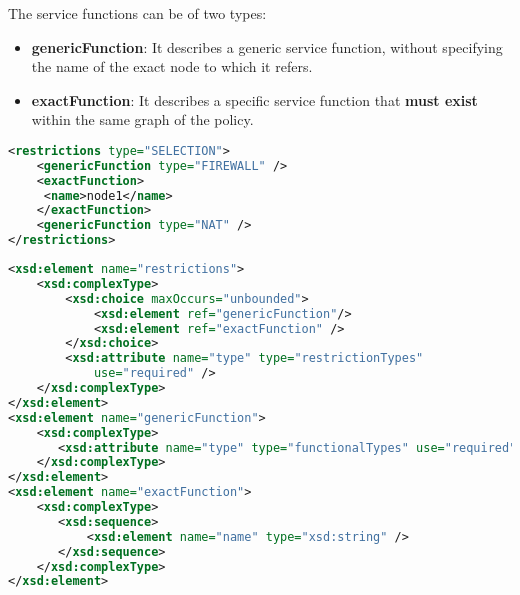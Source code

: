 The service functions can be of two types:
\begin{itemize}
 \item \textbf{genericFunction}: It describes a generic service function, without specifying the name of the exact node to which it refers.
 \item \textbf{exactFunction}: It describes a specific service function that \textbf{must exist} within the same graph of the policy.
\end{itemize}

\begin{lstlisting}[language=XML, caption=Restrictions Example]
<restrictions type="SELECTION">
    <genericFunction type="FIREWALL" />
    <exactFunction>
  	 <name>node1</name>
    </exactFunction>
    <genericFunction type="NAT" />
</restrictions>
\end{lstlisting}

\begin{lstlisting}[language=XML, caption=Restrictions schema code snippet]
<xsd:element name="restrictions">
    <xsd:complexType>
    	<xsd:choice maxOccurs="unbounded">
    		<xsd:element ref="genericFunction"/>
    		<xsd:element ref="exactFunction" />
    	</xsd:choice>
        <xsd:attribute name="type" type="restrictionTypes"
            use="required" />
    </xsd:complexType>
</xsd:element>
<xsd:element name="genericFunction">
	<xsd:complexType>
       <xsd:attribute name="type" type="functionalTypes" use="required"/>
   	</xsd:complexType>
</xsd:element>
<xsd:element name="exactFunction">
	<xsd:complexType>
       <xsd:sequence>
           <xsd:element name="name" type="xsd:string" />
       </xsd:sequence>
   	</xsd:complexType>
</xsd:element>
\end{lstlisting}